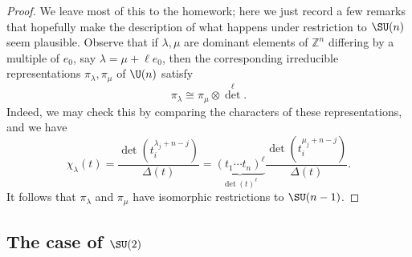 \documentclass[reqno]{amsart} 
\begin{document}
\begin{proof}
  We leave most of this to the homework; here we just record a few remarks that hopefully make the description of what happens under restriction to $\SU(n)$ seem plausible.  Observe that if $\lambda,\mu$ are dominant elements of $\mathbb{Z}^n$ differing by a multiple of $e_0$, say $\lambda = \mu + \ell e_0$, then the corresponding irreducible representations $\pi_\lambda, \pi_\mu$ of $\U(n)$ satisfy
  \begin{equation*}
    \pi_{\lambda} \cong \pi_{\mu} \otimes {\det}^{\ell}.
  \end{equation*}
  Indeed, we may check this by comparing the characters of these representations, and we have
  \begin{equation*}
    \chi_\lambda(t)
    = \frac{\det(t_i^{\lambda_j + n - j})}{\Delta(t)}
    =
    \underbrace{(t_1 \dotsb t_n)^{\ell}}_{\det(t)^{\ell}}
    \frac{\det(t_i^{\mu_j + n - j})}{\Delta(t)}.
  \end{equation*}
  It follows that $\pi_\lambda$ and $\pi_\mu$ have isomorphic restrictions to $\SU(n-1)$.
\end{proof}

\subsection{The case of \texorpdfstring{$\SU(2)$}{SU(2)}}\label{sec:case-su2}
\end{document}

